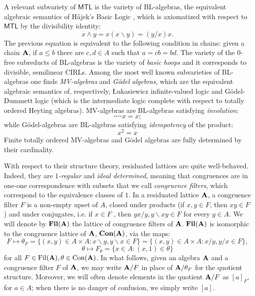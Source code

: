 \documentclass{amsart}
\theoremstyle{definition}
\numberwithin{equation}{section}
\newcommand{\meet}{\wedge}
\newcommand{\alg}[1]{{\textbf{\upshape #1}}}  %
\newcommand{\vv}[1]{\mathsf {#1}}
\newcommand{\back}{\backslash}
\begin{document}
A relevant subvariety of $\vv{MTL}$ is the variety of BL-algebras, the equivalent algebraic semantics of  H\'ajek's Basic Logic \cite{Hajek98}, which is axiomatized with respect to $\vv{MTL}$ by the divisibility identity: 
\begin{equation}
	\tag{div} x \meet y= x(x\backslash y)=(y/x)x.
\end{equation}
The previous equation is equivalent to the following condition in chains: given a chain $\alg A$, if $a \leq b$ there are $c,d \in A$ such that $a=cb=bd$. The variety of the $0$-free subreducts of BL-algebras is the variety of \emph{basic hoops} and it corresponds to divisible, semilinear CIRLs.
Among the most well known subvarieties of BL-algebras one finds \emph{MV-algebras} and {\em G\"odel algebras}, which are the equivalent algebraic semantics of, respectively, \L ukasiewicz infinite-valued logic and G\"odel-Dummett logic (which is the intermediate logic complete with respect to totally ordered Heyting algebras). 
MV-algebras are BL-algebras satisfying \emph{involution}:
\begin{equation*}\tag{inv}
    \neg \neg x=x; 
\end{equation*}
while G\"odel-algebras are BL-algebras satisfying \emph{idempotency} of the product:
\begin{equation*}\tag{id}
	x^2=x
\end{equation*}
Finite totally ordered MV-algebras and G\"odel algebras are fully determined by their cardinality.
  
With respect to their structure theory, residuated lattices are quite well-behaved. Indeed, they are {\em $1$-regular} and {\em ideal determined}, meaning that congruences are in one-one correspondence with subsets that we call {\em congruence filters}, which correspond to the equivalence classes of $1$.
In a residuated lattice $\alg A$, a congruence filter $F$ is a non-empty upset of $A$, closed under products (if $x, y \in F$, then $x y \in F$) and under conjugates, i.e. if $x \in F$ , then $yx/y, y\backslash xy \in F$ for every $y \in A$. We will denote by $\alg {Fil}(\alg A)$ the lattice of congruence filters of $\alg A$. 
 $\alg {Fil}(\alg A)$ is isomorphic to the congruence lattice of $\alg A$, $\alg{Con}(\alg A)$, via the maps:
$$F \mapsto \theta_{F} = \{(x, y) \in A \times A : x \back y, y \back x \in F\} = \{(x, y) \in A \times A: x / y, y / x \in F\},$$
$$\theta \mapsto F_{\theta} = \{x \in A:  (x, 1) \in \theta\}$$
for all $F \in {\rm Fil}(\alg A), \theta \in {\rm Con}(\alg A)$. In what follows, given an algebra $\alg A$ and a congruence filter $F$ of $\alg A$, we may write $\alg A/F$ in place of $\alg A/\theta_F$ for the quotient structure. Moreover, we will often denote elements in the quotient $\alg A/F$ as $[a]_F$, for $a \in A$; when there is no danger of confusion, we simply write $[a]$. 
\end{document}
